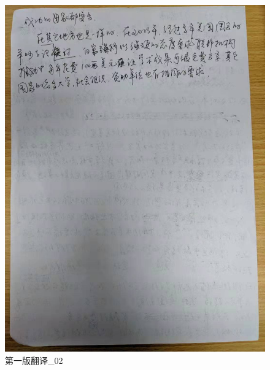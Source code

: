 \documentclass[a4paper, 12pt, UTF8]{article}
\begin{document}
\newpage
\begin{figure}[H]
    \centering
    \includegraphics[width = \textwidth]{original_work_02.jpg}
    \caption{第一版翻译\_02}
    \label{Fig:2}
\end{figure}
\end{document}
